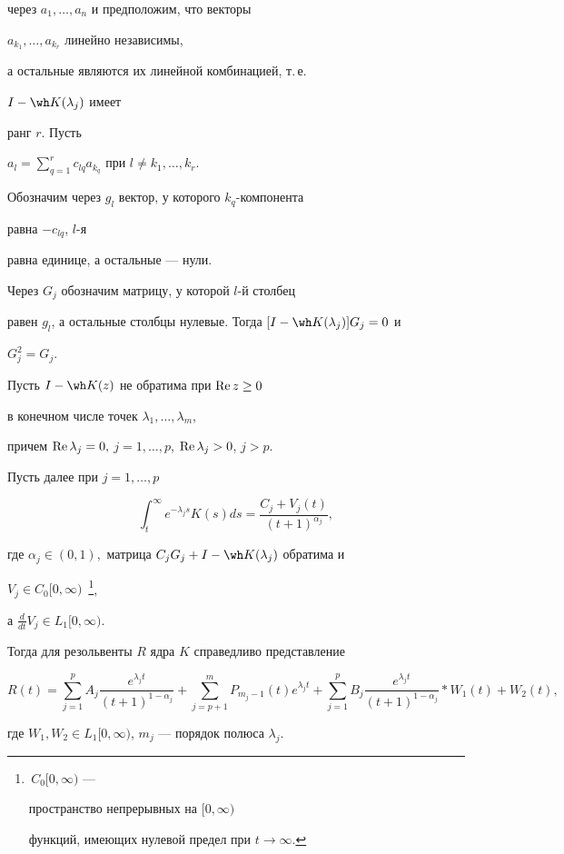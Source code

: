 через $a_1,\dotsc,a_n$ и предположим, что векторы


$a_{k_1},\dotsc,a_{k_r}$ линейно независимы,


а остальные являются их линейной комбинацией, т.\,е.


$I-\wh K(\lambda_j)$ имеет


ранг $r$. Пусть 


$a_l=\sum\limits_{q=1}^r c_{lq}a_{k_q}$ при $l\neq k_1,\dotsc,k_r$.


Обозначим через $g_l$ вектор, у которого $k_q$-компонента


равна $-c_{lq}$, $l$-я


равна единице, а остальные --- нули.


Через $G_j$ обозначим матрицу, у которой $l$-й столбец


равен $g_l$, а остальные столбцы нулевые. Тогда $[I-\wh K(\lambda_j)]G_j=0$ и


$G_j^2=G_j$.





\begin{thm}


Пусть $I-\wh K(z)$ не обратима при $\operatorname{Re} z\geq 0$


в конечном числе точек $\lambda_1,\dotsc,\lambda_m$,


причем $\operatorname{Re} \lambda_j=0,$ $j=1,\dotsc,p$, $\operatorname{Re} \lambda_j>0$, $j>p.$


Пусть далее при $j=1,\dotsc,p$


\begin{equation}


\int_t^{\infty} e^{-\lambda_js}K(s)ds=\frac {C_j+V_j(t)}{(t+1)^{\alpha_j}},


\end{equation}


где $\alpha_j \in (0,1),$ матрица $C_jG_j+I-\wh K(\lambda_j)$ обратима и


$V_j \in C_0[0,\infty)$~\footnote{\,$C_0[0,\infty)$ ---


пространство непрерывных на $[0,\infty)$


функций, имеющих нулевой предел при $t\rightarrow\infty$.},


а $\frac {d}{dt} V_j \in L_1[0,\infty).$


Тогда для резольвенты $R$ ядра $K$ справедливо представление


\begin{equation}


R(t)=\sum\limits_{j=1}^p A_j\frac{e^{\lambda_jt}}{(t+1)^{1-\alpha_j}}+


\sum_{j=p+1}^m P_{m_j-1}(t)e^{\lambda_jt}+


\sum_{j=1}^pB_j\frac{e^{\lambda_jt}}


{(t+1)^{1-\alpha_j}}*W_1(t)+W_2(t),


\end{equation}


где $W_1, W_2\in L_1[0,\infty)$, $m_j$ --- порядок полюса $\lambda_j$.


\end{thm}





